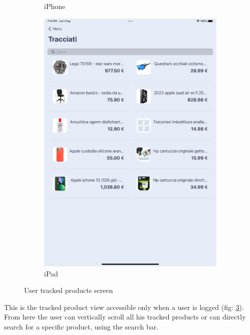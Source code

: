 \begin{figure}[h!]
\begin{subfigure}[b]{0.3\textwidth}
            \caption{iPhone}
            \label{fig:user_tracked_screen_iphone}
        \end{subfigure}
        \begin{subfigure}[b]{0.45\textwidth}
            \centering
            \includegraphics[width=\textwidth]{images/interfaces/user_tracked_screen_ipad.png}
            \caption{iPad}
            \label{fig:user_tracked_screen_ipad}
        \end{subfigure}
         \caption{User tracked products screen}
        \label{fig:user_tracked_screen}
\end{figure}
\FloatBarrier
This is the tracked product view accessible only  when a user is logged (fig: \ref{fig:user_tracked_screen}). From here the user can vertically scroll all his tracked products or can directly search for a specific product, using the search bar.

